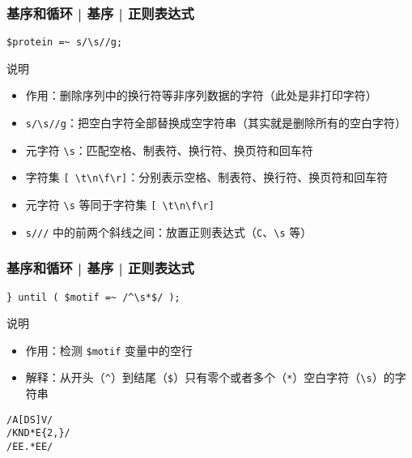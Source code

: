 \begin{frame}[fragile]
  \frametitle{基序和循环 | 基序 | \alert{正则表达式}}
\begin{lstlisting}
$protein =~ s/\s//g;
\end{lstlisting}
\pause
  \begin{block}{说明}
    \begin{itemize}
      \item 作用：删除序列中的换行符等非序列数据的字符（此处是非打印字符）
      \item \verb|s/\s//g|：把空白字符全部替换成空字符串（其实就是删除所有的空白字符）
      \item 元字符 \verb|\s|：匹配空格、制表符、换行符、换页符和回车符
      \item 字符集 \verb|[ \t\n\f\r]|：分别表示空格、制表符、换行符、换页符和回车符
      \item 元字符 \verb|\s| 等同于字符集 \verb|[ \t\n\f\r]|
      \item \verb|s///| 中的前两个斜线之间：放置正则表达式（\verb|C|、\verb|\s| 等）
    \end{itemize}
  \end{block}
\end{frame}

\begin{frame}[fragile]
  \frametitle{基序和循环 | 基序 | \alert{正则表达式}}
\begin{lstlisting}
} until ( $motif =~ /^\s*$/ );
\end{lstlisting}
\pause
\begin{block}{说明}
  \begin{itemize}
    \item 作用：检测 \verb|$motif| 变量中的空行
    \item 解释：从开头（\verb|^|）到结尾（\verb|$|）只有零个或者多个（\verb|*|）空白字符（\verb|\s|）的字符串
  \end{itemize}
\end{block}
\pause
\begin{lstlisting}
/A[DS]V/
/KND*E{2,}/
/EE.*EE/
\end{lstlisting}
\end{frame}

